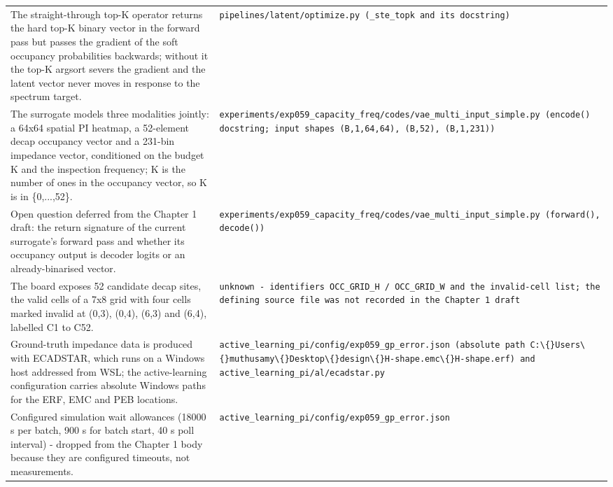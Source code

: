 \begin{longtable}{p{} p{}}
The straight-through top-K operator returns the hard top-K binary vector in the forward pass but passes the gradient of the soft occupancy probabilities backwards; without it the top-K argsort severs the gradient and the latent vector never moves in response to the spectrum target. & \texttt{pipelines/\allowbreak{}latent/\allowbreak{}optimize.py (\_\allowbreak{}ste\_\allowbreak{}topk and its docstring)} \\
The surrogate models three modalities jointly: a 64x64 spatial PI heatmap, a 52-element decap occupancy vector and a 231-bin impedance vector, conditioned on the budget K and the inspection frequency; K is the number of ones in the occupancy vector, so K is in \{0,...,52\}. & \texttt{experiments/\allowbreak{}exp059\_\allowbreak{}capacity\_\allowbreak{}freq/\allowbreak{}codes/\allowbreak{}vae\_\allowbreak{}multi\_\allowbreak{}input\_\allowbreak{}simple.py (encode() docstring; input shapes (B,1,64,64), (B,52), (B,1,231))} \\
Open question deferred from the Chapter 1 draft: the return signature of the current surrogate's forward pass and whether its occupancy output is decoder logits or an already-binarised vector. & \texttt{experiments/\allowbreak{}exp059\_\allowbreak{}capacity\_\allowbreak{}freq/\allowbreak{}codes/\allowbreak{}vae\_\allowbreak{}multi\_\allowbreak{}input\_\allowbreak{}simple.py (forward(), decode())} \\
The board exposes 52 candidate decap sites, the valid cells of a 7x8 grid with four cells marked invalid at (0,3), (0,4), (6,3) and (6,4), labelled C1 to C52. & \texttt{unknown - identifiers OCC\_\allowbreak{}GRID\_\allowbreak{}H /\allowbreak{} OCC\_\allowbreak{}GRID\_\allowbreak{}W and the invalid-cell list; the defining source file was not recorded in the Chapter 1 draft} \\
Ground-truth impedance data is produced with ECADSTAR, which runs on a Windows host addressed from WSL; the active-learning configuration carries absolute Windows paths for the ERF, EMC and PEB locations. & \texttt{active\_\allowbreak{}learning\_\allowbreak{}pi/\allowbreak{}config/\allowbreak{}exp059\_\allowbreak{}gp\_\allowbreak{}error.json (absolute path C:\textbackslash\{\}Users\textbackslash\{\}muthusamy\textbackslash\{\}Desktop\textbackslash\{\}design\textbackslash\{\}H-shape.emc\textbackslash\{\}H-shape.erf) and active\_\allowbreak{}learning\_\allowbreak{}pi/\allowbreak{}al/\allowbreak{}ecadstar.py} \\
Configured simulation wait allowances (18000 s per batch, 900 s for batch start, 40 s poll interval) - dropped from the Chapter 1 body because they are configured timeouts, not measurements. & \texttt{active\_\allowbreak{}learning\_\allowbreak{}pi/\allowbreak{}config/\allowbreak{}exp059\_\allowbreak{}gp\_\allowbreak{}error.json} \\

\end{longtable}
